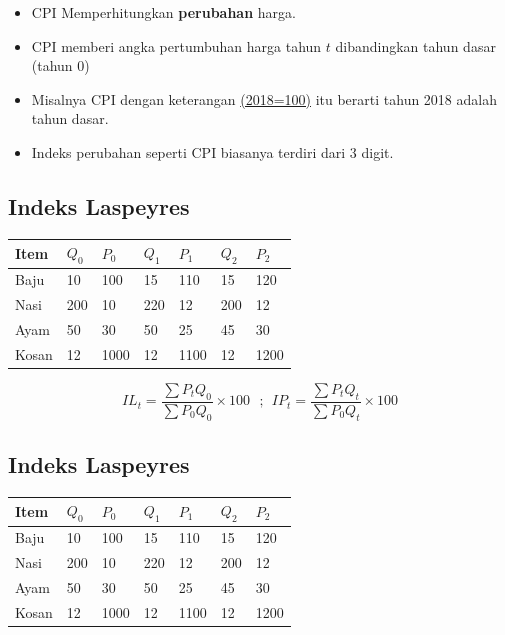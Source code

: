 \documentclass[
  letterpaper,
  DIV=11,
  numbers=noendperiod]{scrartcl}
\begin{document}
\begin{itemize}
\item
  CPI Memperhitungkan \textbf{perubahan} harga.
\item
  CPI memberi angka pertumbuhan harga tahun \(t\) dibandingkan tahun
  dasar (tahun 0)
\item
  Misalnya CPI dengan keterangan
  \href{https://www.bps.go.id/id/statistics-table/2/MTcwOSMy/indeks-harga-konsumen-90-kota--umum-.html}{(2018=100)}
  itu berarti tahun 2018 adalah tahun dasar.
\item
  Indeks perubahan seperti CPI biasanya terdiri dari 3 digit.
\end{itemize}

\subsection{Indeks Laspeyres}\label{indeks-laspeyres}

\begin{longtable}[]{@{}lllllll@{}}
\toprule\noalign{}
Item & \(Q_0\) & \(P_0\) & \(Q_1\) & \(P_1\) & \(Q_2\) & \(P_2\) \\
\midrule\noalign{}
\endhead
\bottomrule\noalign{}
\endlastfoot
Baju & 10 & 100 & 15 & 110 & 15 & 120 \\
Nasi & 200 & 10 & 220 & 12 & 200 & 12 \\
Ayam & 50 & 30 & 50 & 25 & 45 & 30 \\
Kosan & 12 & 1000 & 12 & 1100 & 12 & 1200 \\
\end{longtable}

\[
IL_t=\frac{\sum P_t Q_0}{\sum P_0 Q_0} \times 100 \ \ \ ; \ \ IP_t=\frac{\sum P_t Q_t}{\sum P_0 Q_t} \times 100
\]

\subsection{Indeks Laspeyres}\label{indeks-laspeyres-1}

\begin{longtable}[]{@{}lllllll@{}}
\toprule\noalign{}
Item & \(Q_0\) & \(P_0\) & \(Q_1\) & \(P_1\) & \(Q_2\) & \(P_2\) \\
\midrule\noalign{}
\endhead
\bottomrule\noalign{}
\endlastfoot
Baju & 10 & 100 & 15 & 110 & 15 & 120 \\
Nasi & 200 & 10 & 220 & 12 & 200 & 12 \\
Ayam & 50 & 30 & 50 & 25 & 45 & 30 \\
Kosan & 12 & 1000 & 12 & 1100 & 12 & 1200 \\
\end{longtable}
\end{document}
